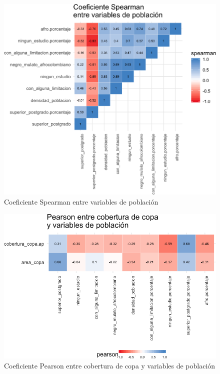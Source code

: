 \documentclass[12pt,a4paper,openany]{book}
\theoremstyle{definition}
\theoremstyle{definition}
\theoremstyle{definition}
\theoremstyle{remark}
\begin{document}
\begin{figure}[H]

{\centering \includegraphics[width=1\linewidth]{tesis-unigis_files/figure-latex/tile-poblacion-spearman-1} 

}

\caption{Coeficiente Spearman entre variables de población}\label{fig:tile-poblacion-spearman}
\end{figure}

\begin{figure}[H]

{\centering \includegraphics[width=1\linewidth]{tesis-unigis_files/figure-latex/tile-copa-poblacion-pearson-1} 

}

\caption{Coeficiente Pearson entre cobertura de copa y variables de población}\label{fig:tile-copa-poblacion-pearson}
\end{figure}
\end{document}
